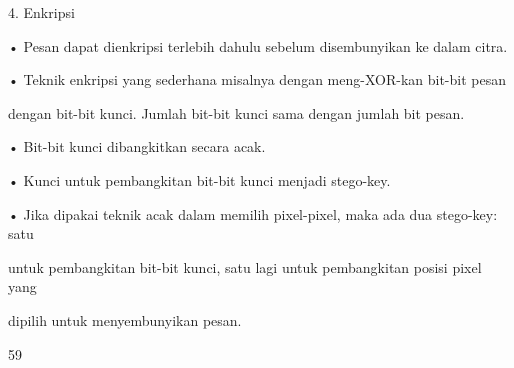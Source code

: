 \documentclass{article}
\begin{document}

4.  Enkripsi   

• Pesan dapat dienkripsi terlebih dahulu sebelum disembunyikan ke dalam citra. 

• Teknik enkripsi yang sederhana misalnya dengan meng-XOR-kan bit-bit pesan 

dengan bit-bit kunci. Jumlah bit-bit kunci sama dengan jumlah bit pesan.

• Bit-bit kunci dibangkitkan secara acak.

• Kunci untuk pembangkitan bit-bit kunci menjadi stego-key.

• Jika dipakai teknik acak dalam memilih pixel-pixel, maka ada dua stego-key: satu 

untuk pembangkitan bit-bit kunci, satu lagi untuk pembangkitan posisi pixel yang 

dipilih untuk menyembunyikan pesan. 

59
\end{document}
